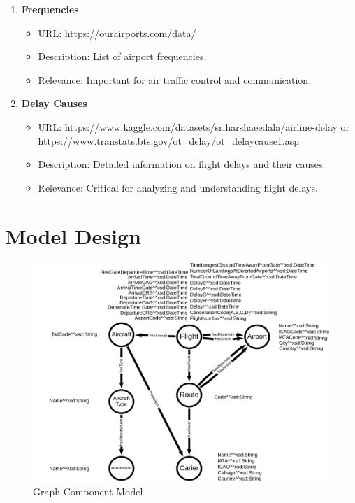 \documentclass{article}
\begin{document}
\begin{enumerate}
    \item \textbf{Frequencies}
    \begin{itemize}
        \item URL: \href{https://ourairports.com/data/}{https://ourairports.com/data/}
        \item Description: List of airport frequencies.
        \item Relevance: Important for air traffic control and communication.
    \end{itemize}
    
    \item \textbf{Delay Causes}
    \begin{itemize}
        \item URL: \href{https://www.kaggle.com/datasets/sriharshaeedala/airline-delay}{https://www.kaggle.com/datasets/sriharshaeedala/airline-delay} or \href{https://www.transtats.bts.gov/ot_delay/ot_delaycause1.asp}{https://www.transtats.bts.gov/ot_delay/ot_delaycause1.asp}
        \item Description: Detailed information on flight delays and their causes.
        \item Relevance: Critical for analyzing and understanding flight delays.
    \end{itemize}
\end{enumerate}

\section{Model Design}

\begin{figure}[h!]
    \centering
    \includegraphics[width=\textwidth]{GraphComp.svg}
    \caption{Graph Component Model}
    \label{fig:graph-comp-model}
\end{figure}
\end{document}

